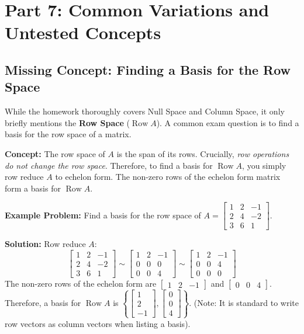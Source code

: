 \documentclass[11pt]{article}
\begin{document}
\newpage

\section{Part 7: Common Variations and Untested Concepts}

\subsection{Missing Concept: Finding a Basis for the Row Space}
While the homework thoroughly covers Null Space and Column Space, it only briefly mentions the \textbf{Row Space} ($\operatorname{Row} A$). A common exam question is to find a basis for the row space of a matrix.

\textbf{Concept:} The row space of $A$ is the span of its rows. Crucially, \textit{row operations do not change the row space}. Therefore, to find a basis for $\operatorname{Row} A$, you simply row reduce $A$ to echelon form. The non-zero rows of the echelon form matrix form a basis for $\operatorname{Row} A$.

\textbf{Example Problem:} Find a basis for the row space of $A = \begin{bmatrix} 1 & 2 & -1 \\ 2 & 4 & -2 \\ 3 & 6 & 1 \end{bmatrix}$.

\textbf{Solution:}
Row reduce $A$:
\[
\begin{bmatrix} 1 & 2 & -1 \\ 2 & 4 & -2 \\ 3 & 6 & 1 \end{bmatrix} \sim \begin{bmatrix} 1 & 2 & -1 \\ 0 & 0 & 0 \\ 0 & 0 & 4 \end{bmatrix} \sim \begin{bmatrix} 1 & 2 & -1 \\ 0 & 0 & 4 \\ 0 & 0 & 0 \end{bmatrix}
\]
The non-zero rows of the echelon form are $\begin{bmatrix} 1 & 2 & -1 \end{bmatrix}$ and $\begin{bmatrix} 0 & 0 & 4 \end{bmatrix}$.
Therefore, a basis for $\operatorname{Row} A$ is $\left\{ \begin{bmatrix} 1 \\ 2 \\ -1 \end{bmatrix}, \begin{bmatrix} 0 \\ 0 \\ 4 \end{bmatrix} \right\}$. (Note: It is standard to write row vectors as column vectors when listing a basis).
\end{document}

